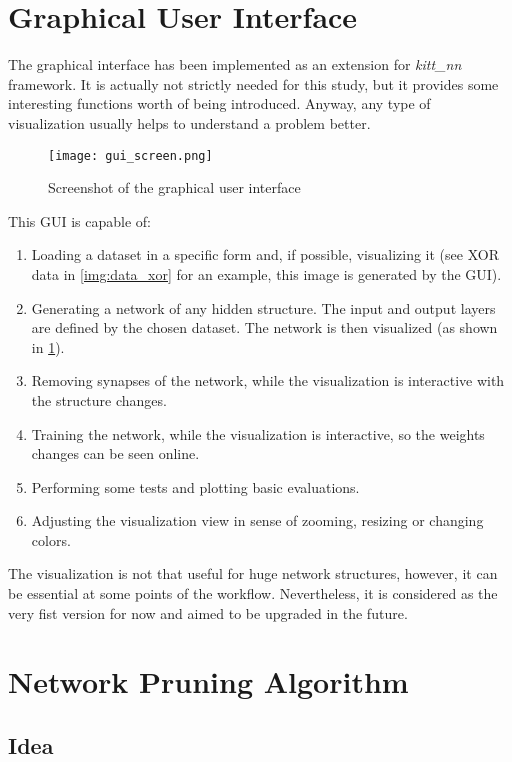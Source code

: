 \section{Graphical User Interface} \label{sec:gui}
The graphical interface has been implemented as an extension for \textit{kitt\_nn} framework. It is actually not strictly needed for this study, but it provides some interesting functions worth of being introduced. Anyway, any type of visualization usually helps to understand a problem better.

\begin{figure}[H]
  \centering
  \texttt{[image: gui\_screen.png]}
  \caption{Screenshot of the graphical user interface}
  \label{img:gui_screen}
\end{figure}

This GUI is capable of:
\begin{enumerate}
\item Loading a dataset in a specific form and, if possible, visualizing it (see XOR data in \cref{img:data_xor} for an example, this image is generated by the GUI).
\item Generating a network of any hidden structure. The input and output layers are defined by the chosen dataset. The network is then visualized (as shown in \cref{img:gui_screen}).
\item Removing synapses of the network, while the visualization is interactive with the structure changes.
\item Training the network, while the visualization is interactive, so the weights changes can be seen online.
\item Performing some tests and plotting basic evaluations.
\item Adjusting the visualization view in sense of zooming, resizing or changing colors.
\end{enumerate}

The visualization is not that useful for huge network structures, however, it can be essential at some points of the workflow. Nevertheless, it is considered as the very fist version for now and aimed to be upgraded in the future.

\newpage
\section{Network Pruning Algorithm} \label{sec:network_pruning_algorithm}

\subsection{Idea}


